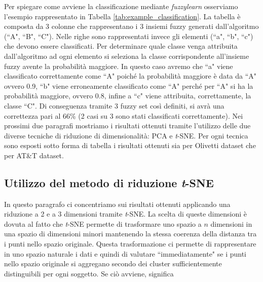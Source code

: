 \documentclass[12pt,italian]{report}
\begin{document}
Per spiegare come avviene la classificazione mediante \emph{fuzzylearn} osserviamo l'esempio rappresentato in Tabella \ref{tab:example_classification}. La tabella è composta da 3 colonne che rappresentano i 3 insiemi fuzzy generati dall'algoritmo (``A", ``B", ``C"). Nelle righe sono rappresentati invece gli elementi (``a", ``b", ``c") che devono essere classificati. Per determinare quale classe venga attribuita dall'algoritmo ad ogni elemento si seleziona la classe corrispondente all'insieme fuzzy avente la probabilità maggiore. In questo caso avremo che ``a" viene classificato correttamente come ``A" poiché la probabilità maggiore è data da ``A" ovvero 0.9, ``b" viene erroneamente classificato come ``A" perché per ``A" si ha la probabilità maggiore, ovvero 0.8, infine a ``c" viene attribuita, correttamente, la classe ``C". Di conseguenza tramite 3 fuzzy set così definiti, si avrà una correttezza pari al 66\% (2 casi su 3 sono stati classificati correttamente).
Nei prossimi due paragrafi mostriamo i risultati ottenuti tramite l'utilizzo delle due diverse tecniche di riduzione di dimensionalità: PCA e \emph{t}-SNE. Per ogni tecnica sono esposti sotto forma di tabella i risultati ottenuti sia per Olivetti dataset che per AT\&T dataset. 

\subsection{Utilizzo del metodo di riduzione \emph{t}-SNE}
In questo paragrafo ci concentriamo sui risultati ottenuti applicando una riduzione a 2 e a 3 dimensioni tramite \emph{t}-SNE. La scelta di queste dimensioni è dovuta al fatto che \emph{t}-SNE permette di trasformare uno spazio a $ n $ dimensioni in una spazio di dimensioni minori mantenendo la stessa coerenza della distanza tra i punti nello spazio originale. Questa trasformazione ci permette di rappresentare in uno spazio naturale i dati e quindi di valutare ``immediatamente" se i punti nello spazio originale si aggregano secondo dei cluster sufficientemente distinguibili per ogni soggetto. Se ciò avviene, significa 

\end{document}
